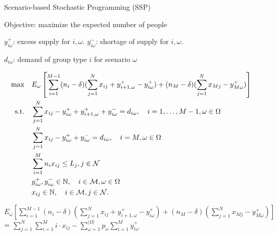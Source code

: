     \begin{frame}{Scenario-based Stochastic Programming (SSP)}
      \begin{scriptsize}
        Objective: maximize the expected number of people

        $y_{i \omega}^{+}$: excess supply for $i, \omega$. $y_{i \omega}^{-}$: shortage of supply for $i, \omega$.

        $d_{i \omega}$: demand of group type $i$ for scenario $\omega$

      \begin{equation}
        \begin{aligned}
        \hspace{-10mm}
        \max \quad & E_{\omega}\left[\sum_{i=1}^{M-1} (n_i-\delta) (\sum_{j= 1}^{N} x_{ij} + y_{i+1,\omega}^{+} - y_{i \omega}^{+}) + (n_{M}-\delta) (\sum_{j= 1}^{N} x_{Mj} - y_{M \omega}^{+})\right] \\
        \text {s.t.} \quad & \sum_{j= 1}^{N} x_{ij}-y_{i \omega}^{+}+
        y_{i+1, \omega}^{+} + y_{i \omega}^{-}=d_{i \omega}, \quad i = 1,\ldots,M-1, \omega \in \Omega \\
        & \sum_{j= 1}^{N} x_{ij} -y_{i \omega}^{+}+y_{i \omega}^{-}=d_{i \omega}, \quad i = M, \omega \in \Omega \\
        & \sum_{i=1}^{M} n_{i} x_{ij} \leq L_j, j \in \mathcal{N}\\
        & y_{i \omega}^{+}, y_{i \omega}^{-} \in \mathbb{N}, \quad i \in \mathcal{M}, \omega \in \Omega \\
        & x_{ij} \in \mathbb{N}, \quad i \in \mathcal{M}, j \in \mathcal{N}.
        \end{aligned}
      \end{equation}
      \end{scriptsize}

      \begin{tiny}
        $E_{\omega}\left[\sum_{i=1}^{M-1} (n_i-\delta) (\sum_{j= 1}^{N} x_{ij} + y_{i+1,\omega}^{+} - y_{i \omega}^{+}) + (n_{M}-\delta) (\sum_{j= 1}^{N} x_{Mj} - y_{M \omega}^{+})\right]$ = $\sum_{j =1}^{N} \sum_{i=1}^M i \cdot x_{ij} - \sum_{\omega =1}^{|\Omega|} p_{\omega} \sum_{i = 1}^{M} y_{i \omega}^{+}$
      \end{tiny}
    \end{frame}

